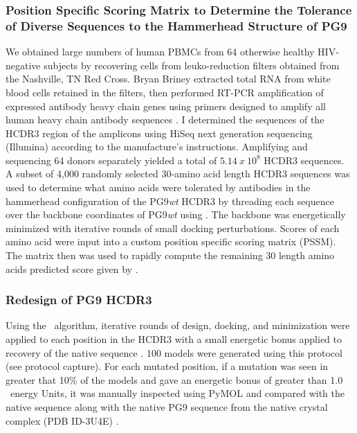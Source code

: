 \subsubsection{Position Specific Scoring Matrix to Determine the Tolerance of Diverse Sequences to the Hammerhead Structure of PG9}
We obtained large numbers of human PBMCs from 64 otherwise healthy HIV-negative subjects by recovering cells from leuko-reduction filters obtained from the Nashville, TN Red Cross. Bryan Briney extracted total RNA from white blood cells retained in the filters, then performed RT-PCR amplification of expressed antibody heavy chain genes using primers designed to amplify all human heavy chain antibody sequences \citep{Briney:2012ib}. I determined the sequences of the HCDR3 region of the amplicons using HiSeq next generation sequencing (Illumina) according to the manufacture's instructions. Amplifying and sequencing 64 donors separately yielded a total of $5.14~x~10^{8}$ HCDR3 sequences. A subset of 4,000 randomly selected 30-amino acid length HCDR3 sequences was used to determine what amino acids were tolerated by antibodies in the hammerhead configuration of the PG9\textit{wt} HCDR3 by threading each sequence over the backbone coordinates of PG9\textit{wt} using \rosetta. The backbone was energetically minimized with iterative rounds of small docking perturbations. Scores of each amino acid were input into a custom position specific scoring matrix (PSSM). The matrix then was used to rapidly compute the remaining 30 length amino acids predicted score given by \rosetta.

\subsubsection{Redesign of PG9 HCDR3}
Using the \rosettadesign~algorithm, iterative rounds of design, docking, and minimization were applied to each position in the HCDR3 with a small energetic bonus applied to recovery of the native sequence \citep{Kuhlman:2000tc}. 100 models were generated using this protocol (see protocol capture). For each mutated position, if a mutation was seen in greater that 10\% of the models and gave an energetic bonus of greater than 1.0 \rosetta~energy Units, it was manually inspected using PyMOL and compared with the native sequence along with the native PG9 sequence from the native crystal complex (PDB ID-3U4E) \citep{McLellan:2011dg}.


